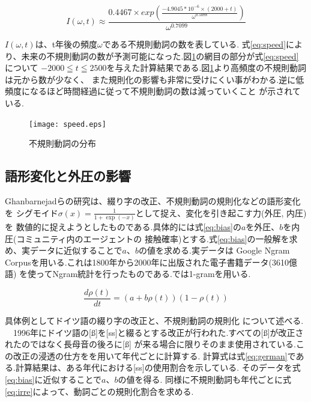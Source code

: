 \documentclass[10.5pt, a4j, twocolumn]{jsarticle}
\begin{document}
\begin{equation}
I (\omega , t) \approx  \frac{0.4467 \times exp\left( \frac{- 4.9045*10^{-6}\times\left(2000+t\right)}{\omega^{0.5088}}\right)}{ \omega^{0.7099}} \label{eq:speed}
\end{equation}

$I (\omega , t)$は、t年後の頻度$ \omega $である不規則動詞の数を表している.
式\ref{eq:speed}により、未来の不規則動詞の数が予測可能になった.図\ref{fig:speed}の網目の部分が式\ref{eq:speed}
について $ -2000 \leqq t \leqq 2500$を与えた計算結果である.図\ref{fig:speed}より高頻度の不規則動詞は元から数が少なく、
また規則化の影響も非常に受けにくい事がわかる.逆に低頻度になるほど時間経過に従って不規則動詞の数は減っていくこと
が示されている.

\begin{figure}[htbp]
 \centering
 \texttt{[image: speed.eps]}
 \caption{不規則動詞の分布\label{fig:speed}}
\end{figure}

\subsection{語形変化と外圧の影響}
Ghanbarnejadらの研究\cite{scurve}は、綴り字の改正、不規則動詞の規則化などの語形変化を
シグモイド$\sigma(x)=\frac{1}{1+\exp(-x)}$として捉え、変化を引き起こす力(外圧, 内圧)を
数値的に捉えようとしたものである.具体的には式\ref{eq:bias}の$a$を外圧、$b$を内圧(コミュニティ内のエージェントの
接触確率)とする.式\ref{eq:bias}の一般解を求め、実データに近似することで$a$、$b$の値を求める.実データは
Google Ngram Corpus\cite{google}を用いる.これは1800年から2000年に出版された電子書籍データ(3610億語)
を使ってNgram統計を行ったものである.\cite{scurve}では1-gramを用いる.

\begin{equation}
\frac{d \rho(t)}{dt}=\left(a+b\rho(t)\right)\left(1 - \rho(t)\right) \label{eq:bias}
\end{equation}

具体例としてドイツ語の綴り字の改正\cite{spelling}と、不規則動詞の規則化
について述べる.\\
　1996年にドイツ語の[\ss]を[ss]と綴るとする改正が行われた.すべての[\ss]が改正されたのではなく長母音の後ろに[\ss]
が来る場合に限りそのまま使用されている.この改正の浸透の仕方を\cite{google}を用いて年代ごとに計算する.
計算式は式\ref{eq:german}である.計算結果は、ある年代における[ss]の使用割合を示している.
そのデータを式\ref{eq:bias}に近似することで$a$、$b$の値を得る.
同様に不規則動詞も年代ごとに式\ref{eq:irre}によって、動詞ごとの規則化割合を求める.
\end{document}
